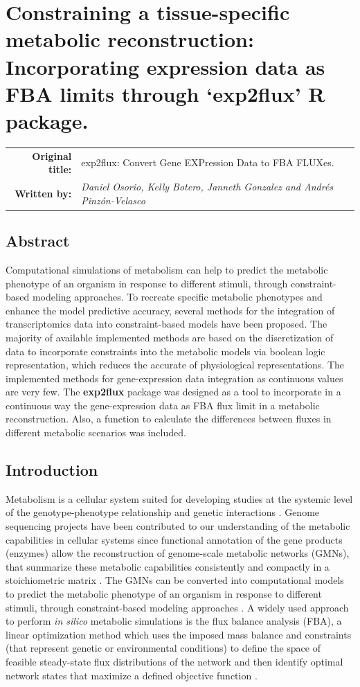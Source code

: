 \chapter{Constraining a tissue-specific metabolic reconstruction:  Incorporating expression data as FBA limits through `exp2flux' R package.}
\begin{tabular}{rm{13cm}}
\textsf{\textbf{Original title:}}& 	exp2flux: Convert Gene EXPression Data to FBA FLUXes.\\
\textsf{\textbf{Written by:}} & \textit{Daniel Osorio, Kelly Botero, Janneth Gonzalez and Andrés Pinzón-Velasco}\\ 
\end{tabular}
\section*{Abstract}
Computational simulations of metabolism can help to predict the metabolic phenotype of an organism in response to different stimuli, through constraint-based modeling approaches. To recreate specific metabolic phenotypes and enhance the model predictive accuracy, several methods for the integration of transcriptomics data into constraint-based models have been proposed.  The majority of available implemented methods are based on the discretization of data to incorporate constraints into the metabolic models via boolean logic representation, which reduces the accurate of physiological representations. The implemented methods for gene-expression data integration as continuous values are very few. The \textbf{exp2flux} package was designed as a tool to incorporate in a continuous way the gene-expression data as FBA flux limit in a metabolic reconstruction. Also, a function to calculate the differences between fluxes in different metabolic scenarios was included.
\section{Introduction}
Metabolism is a cellular system suited for developing studies at the systemic level of the genotype-phenotype relationship and genetic interactions \cite{szappanos2011integrated}. Genome sequencing projects have been contributed to our understanding of the metabolic capabilities in cellular systems since functional annotation of the gene products (enzymes) allow the reconstruction of genome-scale metabolic networks (GMNs), that summarize these metabolic capabilities consistently and compactly in a stoichiometric matrix \cite{price2004genome,liu2010use}. The GMNs can be converted into computational models to predict the metabolic phenotype of an organism in response to different stimuli, through constraint-based modeling approaches \cite{schellenberger2011quantitative,seaver2012frontiers}. A widely used approach to perform \emph{in silico} metabolic simulations is the flux balance analysis (FBA), a linear optimization method which uses the imposed mass balance and constraints (that represent genetic or environmental conditions) to define the space of feasible steady-state flux distributions of the network and then identify optimal network states that maximize a defined objective function \cite{varma1994metabolic, szappanos2011integrated}.\\

